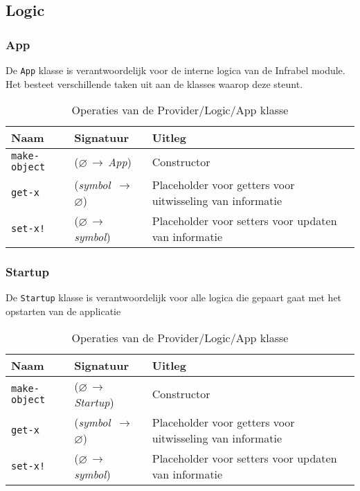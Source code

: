 \documentclass[a4paper, 11pt]{article}
\newcommand{\naar}{\,$\rightarrow$\,}
\renewcommand{\empty}{$\varnothing$}
\newcommand{\<}{\scriptsize\textless\normalsize}
\renewcommand{\>}{\scriptsize\textgreater\normalsize}
\begin{document}
\subsection{Logic} %

\subsubsection{App} %
De \texttt{App} klasse is verantwoordelijk voor de interne logica van de Infrabel module. Het besteet verschillende taken uit aan de klasses waarop deze steunt.
\begin{table}[H]
	\begin{center}
		{
		\begin{tabular}{|l l l|}
			\hline
			\textbf{Naam} & \textbf{Signatuur} & \textbf{Uitleg}\\
			\hline
			\texttt{make-object} & (\empty \naar \textit{App}) & Constructor\\
			\hline
			\texttt{get-x} & (\textit{symbol} \naar \empty) & Placeholder voor getters voor uitwisseling van informatie\\
			\texttt{set-x!} & (\empty \naar \textit{symbol}) & Placeholder voor setters voor updaten van informatie\\
			\hline
		\end{tabular}}
		\caption{Operaties van de Provider/Logic/App klasse}
	\end{center}
\end{table}

\subsubsection{Startup} %
De \texttt{Startup} klasse is verantwoordelijk voor alle logica die gepaart gaat met het opstarten van de applicatie
\begin{table}[H]
	\begin{center}
		{
		\begin{tabular}{|l l l|}
			\hline
			\textbf{Naam} & \textbf{Signatuur} & \textbf{Uitleg}\\
			\hline
			\texttt{make-object} & (\empty \naar \textit{Startup}) & Constructor\\
			\hline
			\texttt{get-x} & (\textit{symbol} \naar \empty) & Placeholder voor getters voor uitwisseling van informatie\\
			\texttt{set-x!} & (\empty \naar \textit{symbol}) & Placeholder voor setters voor updaten van informatie\\
			\hline
		\end{tabular}}
		\caption{Operaties van de Provider/Logic/App klasse}
	\end{center}
\end{table}
\end{document}
